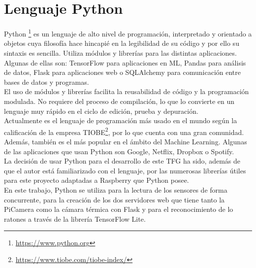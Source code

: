 \section{Lenguaje Python}
\label{sec:python}
Python \footnote{\url{https://www.python.org}} es un lenguaje de alto nivel de programación, interpretado y orientado a objetos cuya filosofía hace hincapié en la legibilidad de su código y por ello su sintaxis es sencilla. Utiliza módulos y librerías para las distintas aplicaciones. Algunas de ellas son: TensorFlow para aplicaciones en ML, Pandas para análisis de datos, Flask para aplicaciones web o SQLAlchemy para comunicación entre bases de datos y programas.\\
El uso de módulos y librerías facilita la reusabilidad de código y la programación modulada. No requiere del proceso de compilación, lo que lo convierte en un lenguaje muy rápido en el ciclo de edición, prueba y depuración.\\
Actualmente es el lenguaje de programación más usado en el mundo según la calificación de la empresa TIOBE\footnote{\url{https://www.tiobe.com/tiobe-index/}}, por lo que cuenta con una gran comunidad. Además, también es el más popular en el ámbito del Machine Learning. Algunas de las aplicaciones que usan Python son Google, Netflix, Dropbox o Spotify.\\

La decisión de usar Python para el desarrollo de este TFG ha sido, además de que el autor está familiarizado con el lenguaje, por las numerosas librerías útiles para este proyecto adaptadas a Raspberry que Python posee.\\
En este trabajo, Python se utiliza para la lectura de los sensores de forma concurrente, para la creación de los dos servidores web que tiene tanto la PiCamera como la cámara térmica con Flask y para el reconocimiento de lo ratones a través de la librería TensorFlow Lite.\\

